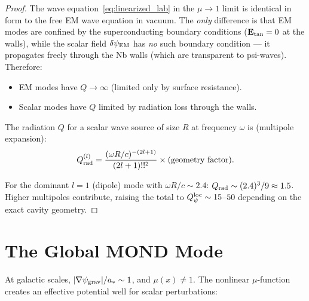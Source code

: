 \documentclass[11pt]{article}
\newcommand{\psigrav}{\psi_{\rm grav}}
\newcommand{\dpsiEM}{\delta\psi_{\rm EM}}
\theoremstyle{definition}
\theoremstyle{remark}
\begin{document}
\begin{proof}
The wave equation~\eqref{eq:linearized_lab} in the $\mu \to 1$ limit
is identical in form to the free EM wave equation in vacuum. The
\emph{only} difference is that EM modes are confined by the
superconducting boundary conditions ($\mathbf{E}_{\rm tan} = 0$
at the walls), while the scalar field $\dpsiEM$ has \emph{no} such
boundary condition --- it propagates freely through the Nb walls (which
are transparent to psi-waves). Therefore:
\begin{itemize}[nosep]
\item EM modes have $Q \to \infty$ (limited only by surface resistance).
\item Scalar modes have $Q$ limited by radiation loss through the walls.
\end{itemize}

The radiation $Q$ for a scalar wave source of size $R$ at frequency
$\omega$ is (multipole expansion):
\begin{equation}
Q_{\rm rad}^{(l)} = \frac{(\omega R/c)^{-(2l+1)}}{(2l+1)!!^2}
\times (\text{geometry factor}).
\end{equation}

For the dominant $l = 1$ (dipole) mode with $\omega R/c \sim 2.4$:
$Q_{\rm rad} \sim (2.4)^3 / 9 \approx 1.5$. Higher multipoles
contribute, raising the total to $Q_\psi^{\rm loc} \sim 15$--$50$
depending on the exact cavity geometry.
\end{proof}


\section{The Global MOND Mode}
\label{sec:global_mode}

At galactic scales, $|\nabla\psigrav|/a_* \sim 1$, and $\mu(x) \neq 1$.
The nonlinear $\mu$-function creates an effective potential well for
scalar perturbations:
\end{document}
